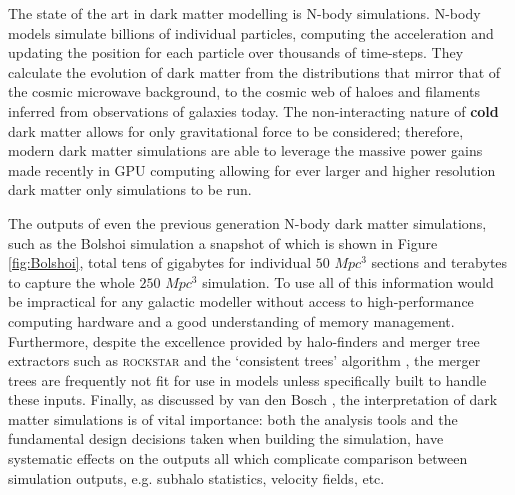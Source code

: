 
The state of the art in dark matter modelling is N-body simulations. N-body models simulate billions of individual particles, computing the acceleration and updating the position for each particle over thousands of time-steps. They calculate the evolution of dark matter from the distributions that mirror that of the cosmic microwave background, to the cosmic web of haloes and filaments inferred from observations of galaxies today. The non-interacting nature of \textbf{cold} dark matter allows for only gravitational force to be considered; therefore, modern dark matter simulations are able to leverage the massive power gains made recently in GPU computing allowing for ever larger and higher resolution dark matter only simulations to be run. 

The outputs of even the previous generation N-body dark matter simulations, such as the Bolshoi simulation a snapshot of which is shown in Figure \ref{fig:Bolshoi}, total tens of gigabytes for individual $50$ $Mpc^3$ sections and terabytes to capture the whole $250$ $Mpc^3$ simulation. To use all of this information would be impractical for any galactic modeller without access to high-performance computing hardware and a good understanding of memory management. Furthermore, despite the excellence provided by halo-finders and merger tree extractors such as \textsc{rockstar} \cite{Behroozi2011TheCores} and the `consistent trees' algorithm \cite{Behroozi2013GRAVITATIONALLYCOSMOLOGY}, the merger trees are frequently not fit for use in models unless specifically built to handle these inputs. Finally, as discussed by van den Bosch \cite{vandenBosch2014ComingWells, vandenBosch2017DissectingSimulation, vandenBosch2018DisruptionFiction}, the interpretation of dark matter simulations is of vital importance: both the analysis tools and the fundamental design decisions taken when building the simulation, have systematic effects on the outputs all which complicate comparison between simulation outputs, e.g. subhalo statistics, velocity fields, etc.

